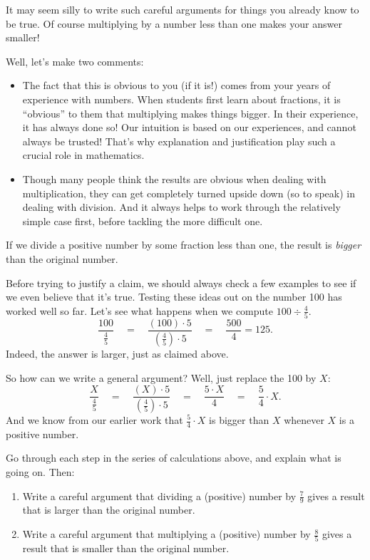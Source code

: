 It may seem silly to write such careful arguments for things you already know to be true.  Of course multiplying by a number less than one makes your answer smaller!

Well, let's make two comments:
\begin{itemize}
\item
The fact that this is obvious to you (if it is!) comes from your years of experience with numbers.  When students first learn about fractions, it is ``obvious'' to them that multiplying makes things bigger.  In their experience, it has always done so!  Our intuition is based on our experiences, and cannot always be trusted!  That's why explanation and justification play such a crucial role in mathematics.
\item
Though many people think the results are obvious when dealing with multiplication, they can get completely turned upside down (so to speak) in dealing with division.  And it always helps to work through the relatively simple case first, before tackling the more difficult one.
\end{itemize}


 If we divide a positive number by some fraction less than one, the result is \emph{bigger} than the original number.

Before trying to justify a claim, we should always check a few examples to see if we even believe that it's true.  Testing these ideas out on the number 100 has worked well so far.  Let's see what happens when we compute $100 \div \frac 4 5.$
\[
\frac{100}{\frac 4 5} 
\quad
=
\quad
\frac{(100)\cdot 5}{\left(\frac 4 5\right)\cdot 5 }
\quad 
=
\quad
\frac{500}4 = 125.
\]
Indeed, the answer is larger, just as claimed above.

So how can we write a general argument?  Well, just replace the 100 by $X$:
\[
\frac{X}{\frac 4 5} 
\quad
=
\quad
\frac{(X)\cdot 5}{\left(\frac 4 5\right)\cdot 5 }
\quad 
=
\quad
\frac{5\cdot X}{4}
\quad 
=
\quad
\frac{5}4 \cdot X.
\]
And we know from our earlier work that $\frac 5 4 \cdot X$ is bigger than $X$ whenever $X$ is a positive number.



\begin{thinkpair*}
Go through each step in the series of calculations above, and explain what is going on.    Then:
\begin{enumerate}
\item
Write a careful argument that dividing a (positive) number by $\frac 7 9$ gives a result that is larger than the original number.\\
\item
 Write a careful argument that multiplying a (positive) number by $\frac 8 5$ gives a result that is smaller than the original number.\\
 \end{enumerate}

\end{thinkpair*}








